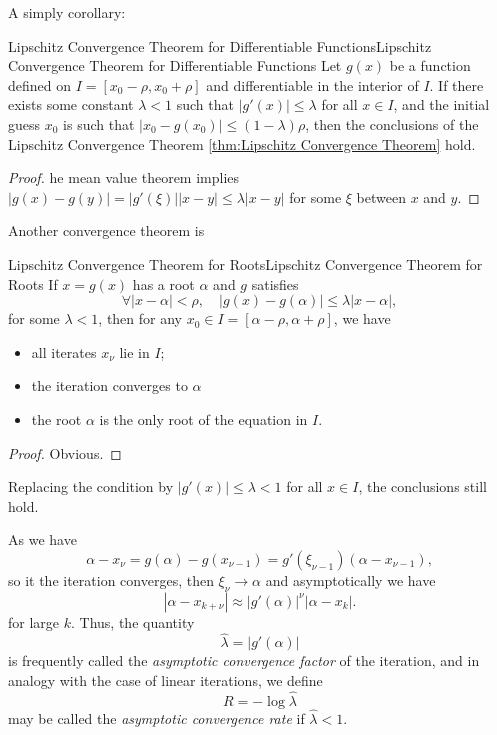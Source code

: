 \documentclass[../main.tex]{subfiles}
\begin{document}
A simply corollary:
\begin{corollary}{Lipschitz Convergence Theorem for Differentiable Functions}{Lipschitz Convergence Theorem for Differentiable Functions}
	Let $g(x)$ be a function defined on $I = [x_0 - \rho, x_0 + \rho]$ and differentiable in the interior of $I$. If there exists some constant $\lambda < 1$ such that $|g'(x)| \leq \lambda$ for all $x \in I$, and the initial guess $x_0$ is such that $|x_0 - g(x_0)| \leq (1 - \lambda) \rho$, then the conclusions of the Lipschitz Convergence Theorem \ref{thm:Lipschitz Convergence Theorem} hold.
\end{corollary}
\begin{proof}
	he mean value theorem implies $|g(x) - g(y)| = |g'(\xi)| |x - y| \leq \lambda |x - y|$ for some $\xi$ between $x$ and $y$.
\end{proof}

Another convergence theorem is
\begin{theorem}{Lipschitz Convergence Theorem for Roots}{Lipschitz Convergence Theorem for Roots}
	If $x = g(x)$ has a root $\alpha$ and $g$ satisfies
	\begin{equation} \label{eq:Lipschitz condition for roots}
		\forall |x - \alpha| < \rho, \quad |g(x) - g(\alpha)| \leq \lambda |x - \alpha|,
	\end{equation}
	for some $\lambda < 1$, then for any $x_0 \in I = [\alpha - \rho, \alpha + \rho]$, we have
	\begin{itemize}
		\item all iterates $x_\nu$ lie in $I$;
		\item the iteration converges to $\alpha$
		\item the root $\alpha$ is the only root of the equation in $I$.
	\end{itemize}
\end{theorem}
\begin{proof}
	Obvious.
\end{proof}
Replacing the condition by $|g'(x)| \leq \lambda < 1$ for all $x \in I$, the conclusions still hold.

As we have
\begin{equation*}
	\alpha - x_{\nu} = g(\alpha) - g(x_{\nu-1}) = g'(\xi_{\nu-1})(\alpha - x_{\nu-1}),
\end{equation*}
so it the iteration converges, then $\xi_{\nu}\to \alpha$ and asymptotically we have
\begin{equation}
	|\alpha - x_{k + \nu}| \approx |g'(\alpha)|^\nu |\alpha - x_k|.
\end{equation}
for large $k$. Thus, the quantity
\begin{equation}
	\hat{\lambda} = |g'(\alpha)|
\end{equation}
is frequently called the \emph{asymptotic convergence factor} of the iteration, and in analogy with the case of linear iterations, we define
\begin{equation}
	R = -\log \hat{\lambda}
\end{equation}
may be called the \emph{asymptotic convergence rate} if $\hat{\lambda} < 1$.
\end{document}

